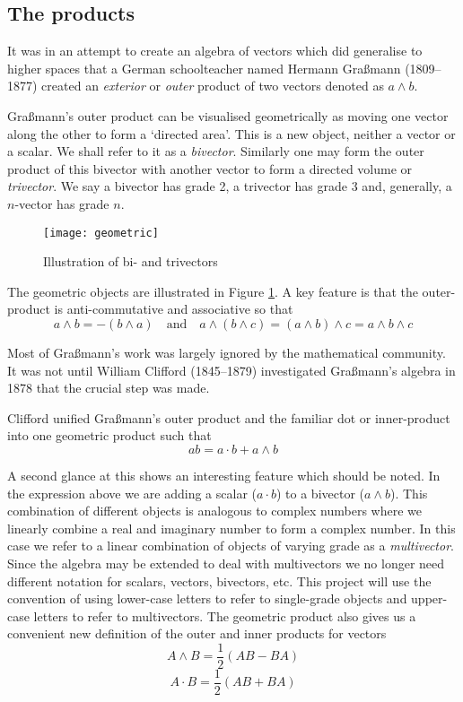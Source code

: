 \subsection{The products}

It was in an attempt \cite{grassmann} to create an algebra of vectors which 
did generalise
to higher spaces that a German schoolteacher named Hermann 
Gra{\ss}mann (1809--1877) created an \emph{exterior} 
or \emph{outer} product of two
vectors denoted as $a \wedge b$. 

Gra{\ss}mann's outer product can be visualised geometrically as moving
one vector along the other to form a `directed area'. This is a new object,
neither a vector or a scalar. We shall refer to it as a \emph{bivector}.
Similarly one may form the outer product of this bivector with another
vector to form a directed volume or \emph{trivector}. We say a 
bivector has grade 2, a trivector has grade 3 and, generally, a
$n$-vector has grade $n$.

\begin{figure}
\centering
\texttt{[image: geometric]}
\caption{Illustration of bi- and trivectors\label{fig:geometric}}
\end{figure}

The geometric objects are illustrated in Figure \ref{fig:geometric}. A 
key feature is that the outer-product is anti-commutative and 
associative so that
\begin{displaymath}
a \wedge b = - ( b \wedge a)\quad\mbox{and}\quad 
a \wedge (b \wedge c) = (a \wedge b) \wedge c = a \wedge b \wedge c
\end{displaymath}

Most of Gra{\ss}mann's work was largely ignored by the mathematical community.
It was not until William Clifford (1845--1879) investigated Gra{\ss}mann's
algebra in 1878 \cite{clifford} that the crucial step was made.

Clifford unified Gra{\ss}mann's outer product and the familiar dot
or inner-product into one geometric product such that
\begin{displaymath}
ab = a\cdot b + a \wedge b
\end{displaymath}

A second glance at this shows an interesting feature which should be noted.
In the expression above we are adding a scalar ($a \cdot b$) to a 
bivector ($a \wedge b$). This combination of different objects is
analogous to complex numbers where we linearly combine
a real and imaginary number to form a complex number. In this case we
refer to a linear combination of objects of varying grade as a
\emph{multivector}. Since the algebra may be extended to deal with
multivectors we no longer need different notation for scalars, vectors,
bivectors, etc. This project will use the convention of using lower-case
letters to refer to single-grade objects and upper-case letters to refer
to multivectors. The geometric product also gives us a convenient new
definition of the outer and inner products for vectors
\[
A \wedge B = \frac{1}{2}(AB - BA)
\]
\[
A \cdot B = \frac{1}{2}(AB + BA)
\]

